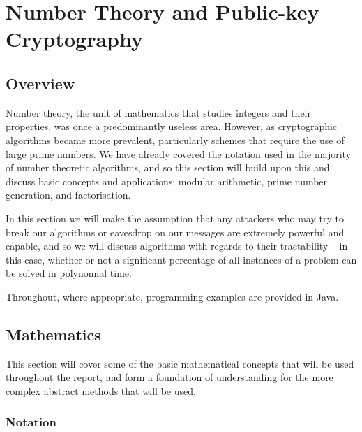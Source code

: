 
\chapter{Number Theory and Public-key Cryptography}
\label{Chapter3}

\section{Overview}

Number theory, the unit of mathematics that studies integers and their properties, was once a predominantly useless area. However, as cryptographic algorithms became more prevalent, particularly schemes that require the use of large prime numbers. We have already covered the notation used in the majority of number theoretic algorithms, and so this section will build upon this and discuss basic concepts and applications: modular arithmetic, prime number generation, and factorisation.

In this section we will make the assumption that any attackers who may try to break our algorithms or eavesdrop on our messages are extremely powerful and capable, and so we will discuss algorithms with regards to their tractability -- in this case, whether or not a significant percentage of all instances of a problem can be solved in polynomial time.

Throughout, where appropriate, programming examples are provided in Java.

\section{Mathematics}

This section will cover some of the basic mathematical concepts that will be used throughout the report, and form a foundation of understanding for the more complex abstract methods that will be used.

\subsection{Notation}

